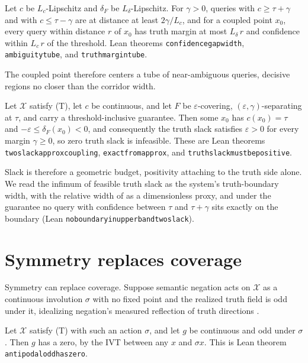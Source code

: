 \documentclass[mlmain,onecolumn]{jmlr}
\newcommand{\X}{\mathcal{X}}
\newcommand{\conf}{c}
\newcommand{\dF}{\delta_{\!F}}
\newcommand{\leanid}[1]{{\def\_{\textunderscore\allowbreak}\texttt{#1}}}
\begin{document}
\begin{theorem}
\label{thm:width}
Let $\conf$ be $L_c$-Lipschitz and $\dF$ be $L_\delta$-Lipschitz.
For $\gamma > 0$, queries with $\conf \ge \tau + \gamma$ and with
$\conf \le \tau - \gamma$ are at distance at least $2\gamma/L_c$,
and for a coupled point $x_0$, every query within distance $r$ of
$x_0$ has truth margin at most $L_\delta \, r$ and confidence
within $L_c \, r$ of the threshold. Lean theorems
\leanid{confidence\_gap\_width}, \leanid{ambiguity\_tube}, and
\leanid{truth\_margin\_tube}.
\end{theorem}

The coupled point therefore centers a tube of near-ambiguous
queries, decisive regions no closer than the corridor width.

\begin{theorem}
\label{thm:approx}
Let $\X$ satisfy (T), let $\conf$ be continuous, and let $F$ be
$\varepsilon$-covering, $(\varepsilon, \gamma)$-separating at
$\tau$, and carry a threshold-inclusive guarantee. Then some $x_0$
has $\conf(x_0) = \tau$ and $-\varepsilon \le \dF(x_0) < 0$, and
consequently the truth slack satisfies $\varepsilon > 0$ for every
margin $\gamma \ge 0$, so zero truth slack is infeasible. These are
Lean theorems \leanid{two\_slack\_approx\_coupling},
\leanid{exact\_from\_approx}, and
\leanid{truth\_slack\_must\_be\_positive}.
\end{theorem}

Slack is therefore a geometric budget, positivity attaching to the
truth side alone. We read the infimum of feasible truth slack as
the system's truth-boundary width, with the relative width of
 as a dimensionless proxy, and under
the guarantee no query with confidence between $\tau$ and
$\tau + \gamma$ sits exactly on the boundary (Lean
\leanid{no\_boundary\_in\_upper\_band\_two\_slack}).

\section{Symmetry replaces coverage}
\label{sec:antipodal}

Symmetry can replace coverage. Suppose semantic negation acts on
$\X$ as a continuous involution $\sigma$ with no fixed point and
the realized truth field is odd under it, idealizing negation's
measured reflection of truth directions \citep{marks2024geometry}.

\begin{theorem}
\label{thm:odd-zero}
Let $\X$ satisfy (T) with such an action $\sigma$, and let $g$ be
continuous and odd under $\sigma$. Then $g$ has a zero, by the IVT
between any $x$ and $\sigma x$. This is Lean theorem
\leanid{antipodal\_odd\_has\_zero}.
\end{theorem}
\end{document}
